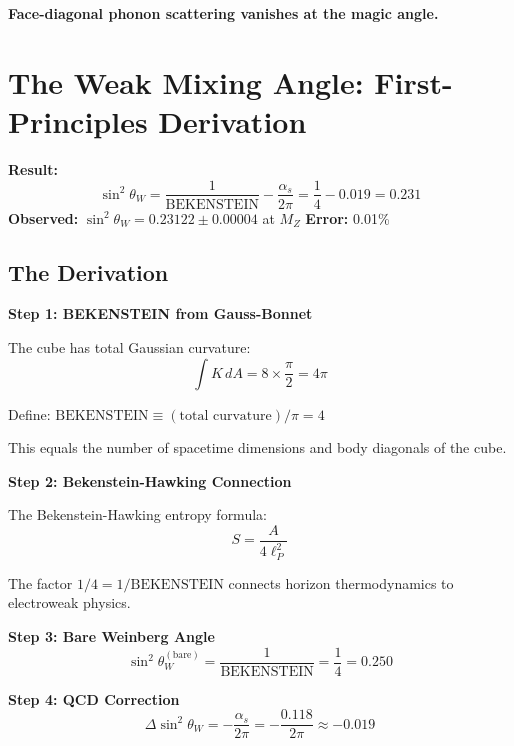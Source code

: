 \documentclass[12pt,a4paper]{article}
\newcommand{\sinW}{\sin^2\theta_W}
\newcommand{\BEKENSTEIN}{\text{BEKENSTEIN}}
\begin{document}
\textbf{Face-diagonal phonon scattering vanishes at the magic angle.}

\section{The Weak Mixing Angle: First-Principles Derivation}
\label{sec:weinberg}

\begin{derivedbox}
\textbf{Result:}
\begin{equation}
\sinW = \frac{1}{\BEKENSTEIN} - \frac{\alpha_s}{2\pi} = \frac{1}{4} - 0.019 = 0.231
\end{equation}
\textbf{Observed:} $\sinW = 0.23122 \pm 0.00004$ at $M_Z$ \quad \textbf{Error:} 0.01\%
\end{derivedbox}

\subsection{The Derivation}

\textbf{Step 1: BEKENSTEIN from Gauss-Bonnet}

The cube has total Gaussian curvature:
\begin{equation}
\int K \, dA = 8 \times \frac{\pi}{2} = 4\pi
\end{equation}

Define: $\BEKENSTEIN \equiv (\text{total curvature})/\pi = 4$

This equals the number of spacetime dimensions and body diagonals of the cube.

\textbf{Step 2: Bekenstein-Hawking Connection}

The Bekenstein-Hawking entropy formula:
\begin{equation}
S = \frac{A}{4\ell_P^2}
\end{equation}

The factor $1/4 = 1/\BEKENSTEIN$ connects horizon thermodynamics to electroweak physics.

\textbf{Step 3: Bare Weinberg Angle}
\begin{equation}
\sin^2\theta_W^{(\text{bare})} = \frac{1}{\BEKENSTEIN} = \frac{1}{4} = 0.250
\end{equation}

\textbf{Step 4: QCD Correction}
\begin{equation}
\Delta\sinW = -\frac{\alpha_s}{2\pi} = -\frac{0.118}{2\pi} \approx -0.019
\end{equation}
\end{document}
